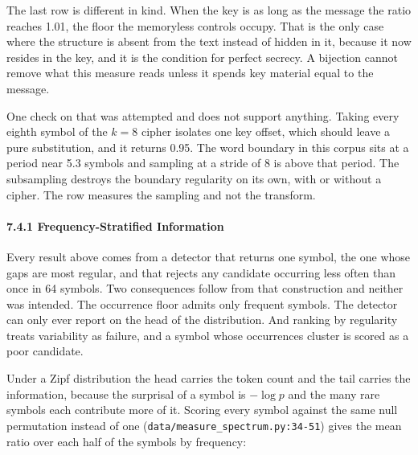 The last row is different in kind. When the key is as long as the message the ratio reaches 1.01, the floor the memoryless controls occupy. That is the only case where the structure is absent from the text instead of hidden in it, because it now resides in the key, and it is the condition for perfect secrecy. A bijection cannot remove what this measure reads unless it spends key material equal to the message.

One check on that was attempted and does not support anything. Taking every eighth symbol of the \(k = 8\) cipher isolates one key offset, which should leave a pure substitution, and it returns 0.95. The word boundary in this corpus sits at a period near 5.3 symbols and sampling at a stride of 8 is above that period. The subsampling destroys the boundary regularity on its own, with or without a cipher. The row measures the sampling and not the transform.

\paragraph{7.4.1 Frequency-Stratified Information}

Every result above comes from a detector that returns one symbol, the one whose gaps are most regular, and that rejects any candidate occurring less often than once in 64 symbols. Two consequences follow from that construction and neither was intended. The occurrence floor admits only frequent symbols. The detector can only ever report on the head of the distribution. And ranking by regularity treats variability as failure, and a symbol whose occurrences cluster is scored as a poor candidate.

Under a Zipf distribution the head carries the token count and the tail carries the information, because the surprisal of a symbol is \(-\log p\) and the many rare symbols each contribute more of it. Scoring every symbol against the same null permutation instead of one (\texttt{data/\allowbreak{}measure\_\allowbreak{}spectrum.\allowbreak{}py:34-\allowbreak{}51}) gives the mean ratio over each half of the symbols by frequency:

